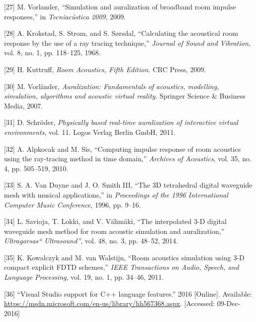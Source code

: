 \documentclass[]{scrreprt}
\begin{document}
\hypertarget{ref-vorlanderux5fsimulationux5f2009}{}
{[}27{]} M. Vorlander, ``Simulation and auralization of broadband room
impulse responses,'' in \emph{Tecniacústica 2009}, 2009.

\hypertarget{ref-krokstadux5fcalculatingux5f1968}{}
{[}28{]} A. Krokstad, S. Strom, and S. Sørsdal, ``Calculating the
acoustical room response by the use of a ray tracing technique,''
\emph{Journal of Sound and Vibration}, vol. 8, no. 1, pp. 118--125,
1968.

\hypertarget{ref-kuttruffux5froomux5f2009}{}
{[}29{]} H. Kuttruff, \emph{Room Acoustics, Fifth Edition}. CRC Press,
2009.

\hypertarget{ref-vorlanderux5fauralization:ux5f2007}{}
{[}30{]} M. Vorländer, \emph{Auralization: Fundamentals of acoustics,
modelling, simulation, algorithms and acoustic virtual reality}.
Springer Science \& Business Media, 2007.

\hypertarget{ref-schroderux5fphysicallyux5f2011}{}
{[}31{]} D. Schröder, \emph{Physically based real-time auralization of
interactive virtual environments}, vol. 11. Logos Verlag Berlin GmbH,
2011.

\hypertarget{ref-alpkocakux5fcomputingux5f2010}{}
{[}32{]} A. Alpkocak and M. Sis, ``Computing impulse response of room
acoustics using the ray-tracing method in time domain,'' \emph{Archives
of Acoustics}, vol. 35, no. 4, pp. 505--519, 2010.

\hypertarget{ref-vanux5fduyneux5f3dux5f1996}{}
{[}33{]} S. A. Van Duyne and J. O. Smith III, ``The 3D tetrahedral
digital waveguide mesh with musical applications,'' in \emph{Proceedings
of the 1996 International Computer Music Conference}, 1996, pp. 9--16.

\hypertarget{ref-saviojaux5finterpolatedux5f2014}{}
{[}34{]} L. Savioja, T. Lokki, and V. Välimäki, ``The interpolated 3-D
digital waveguide mesh method for room acoustic simulation and
auralization,'' \emph{Ultragarsas`` Ultrasound''}, vol. 48, no. 3, pp.
48--52, 2014.

\hypertarget{ref-kowalczykux5froomux5f2011}{}
{[}35{]} K. Kowalczyk and M. van Walstijn, ``Room acoustics simulation
using 3-D compact explicit FDTD schemes,'' \emph{IEEE Transactions on
Audio, Speech, and Language Processing}, vol. 19, no. 1, pp. 34--46,
2011.

\hypertarget{ref-ux5fvisualux5f2016}{}
{[}36{]} ``Visual Studio support for C++ language features.'' 2016
{[}Online{]}. Available:
\url{https://msdn.microsoft.com/en-us/library/hh567368.aspx}.
{[}Accessed: 09-Dec-2016{]}
\end{document}
